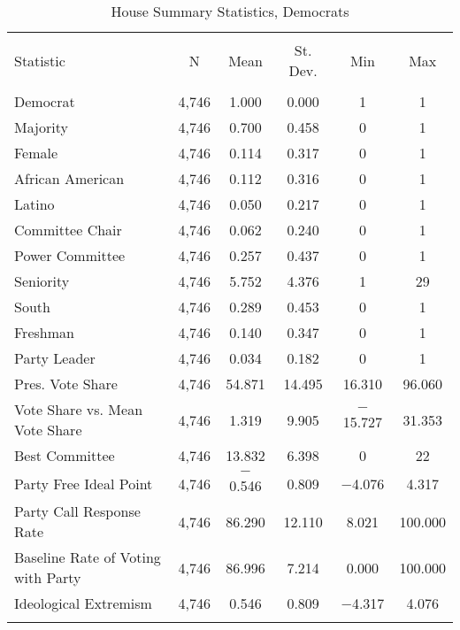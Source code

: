 \documentclass[12pt]{article}
\begin{document}
\begin{table}[!htbp] \centering 
	\caption{House Summary Statistics, Democrats} 
	\label{} 
	\begin{tabular}{@{\extracolsep{5pt}}lccccc} 
		\\[-1.8ex]\hline 
		\hline \\[-1.8ex] 
		Statistic & \multicolumn{1}{c}{N} & \multicolumn{1}{c}{Mean} & \multicolumn{1}{c}{St. Dev.} & \multicolumn{1}{c}{Min} & \multicolumn{1}{c}{Max} \\ 
		\hline \\[-1.8ex]  
		Democrat & 4,746 & 1.000 & 0.000 & 1 & 1 \\ 
		Majority & 4,746 & 0.700 & 0.458 & 0 & 1 \\ 
		Female & 4,746 & 0.114 & 0.317 & 0 & 1 \\ 
		African American & 4,746 & 0.112 & 0.316 & 0 & 1 \\ 
		Latino & 4,746 & 0.050 & 0.217 & 0 & 1 \\ 
		Committee Chair & 4,746 & 0.062 & 0.240 & 0 & 1 \\ 
		Power Committee & 4,746 & 0.257 & 0.437 & 0 & 1 \\ 
		Seniority & 4,746 & 5.752 & 4.376 & 1 & 29 \\ 
		South & 4,746 & 0.289 & 0.453 & 0 & 1 \\ 
		Freshman & 4,746 & 0.140 & 0.347 & 0 & 1 \\ 
		Party Leader & 4,746 & 0.034 & 0.182 & 0 & 1 \\ 
		Pres. Vote Share & 4,746 & 54.871 & 14.495 & 16.310 & 96.060 \\ 
		Vote Share vs. Mean Vote Share & 4,746 & 1.319 & 9.905 & $-$15.727 & 31.353 \\ 
		Best Committee & 4,746 & 13.832 & 6.398 & 0 & 22 \\ 
		Party Free Ideal Point & 4,746 & $-$0.546 & 0.809 & $-$4.076 & 4.317 \\ 
		Party Call Response Rate & 4,746 & 86.290 & 12.110 & 8.021 & 100.000 \\ 
		Baseline Rate of Voting with Party & 4,746 & 86.996 & 7.214 & 0.000 & 100.000 \\ 
		Ideological Extremism & 4,746 & 0.546 & 0.809 & $-$4.317 & 4.076 \\ 
		\hline \\[-1.8ex] 
	\end{tabular} 
\end{table} 
\end{document}
